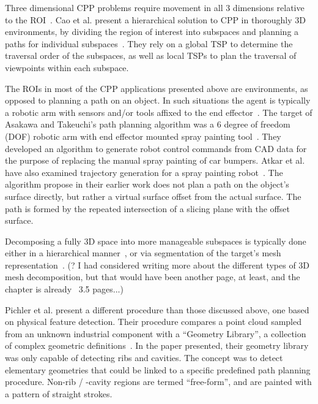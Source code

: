 Three dimensional CPP problems require movement in all 3 dimensions relative to the ROI~\cite{CPP_survey_for_robotics}.
Cao et al. present a hierarchical solution to CPP in thoroughly 3D environments, by dividing the region of interest into subspaces and planning a paths for individual subspaces~\cite{HiCPP_cplx_3D_env}.
They rely on a global TSP to determine the traversal order of the subspaces, as well as local TSPs to plan the traversal of viewpoints within each subspace.

The ROIs in most of the CPP applications presented above are environments, as opposed to planning a path on an object.
In such situations the agent is typically a robotic arm with sensors and/or tools affixed to the end effector~\cite{Metal_polishing_robot_sys, Automatic_spray_painting_unknown_parts}.
The target of Asakawa and Takeuchi's path planning algorithm was a 6 degree of freedom (DOF) robotic arm with end effector mounted spray painting tool~\cite{Automatic_spray_painting_path}.
They developed an algorithm to generate robot control commands from CAD data for the purpose of replacing the manual spray painting of car bumpers.
Atkar et al. have also examined trajectory generation for a spray painting robot~\cite{Uniform_cov_auto_surfaces, Exact_cell_decomp_orientable_surfaces}.
The algorithm propose in their earlier work does not plan a path on the object's surface directly, but rather a virtual surface offset from the actual surface.
The path is formed by the repeated intersection of a slicing plane with the offset surface.

Decomposing a fully 3D space into more manageable subspaces is typically done either in a hierarchical manner~\cite{HiCPP_cplx_3D_env}, or via segmentation of the target's mesh representation~\cite{Mesh_segm_technik_survey}.
(? I had considered writing more about the different types of 3D mesh decomposition, but that would have been another page, at least, and the chapter is already ~3.5 pages...)

Pichler et al. present a different procedure than those discussed above, one based on physical feature detection.
Their procedure compares a point cloud sampled from an unknown industrial component with a ``Geometry Library'', a collection of complex geometric definitions~\cite{Automatic_spray_painting_unknown_parts}.
In the paper presented, their geometry library was only capable of detecting ribs and cavities.
The concept was to detect elementary geometries that could be linked to a specific predefined path planning procedure.
Non-rib / -cavity regions are termed ``free-form'', and are painted with a pattern of straight strokes.

